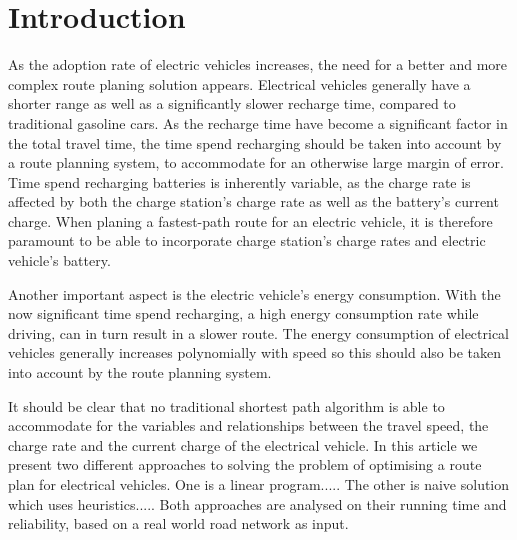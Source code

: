 \section{Introduction}
As the adoption rate of electric vehicles increases, the need for a better and more complex route planing solution appears. Electrical vehicles generally have a shorter range as well as a significantly slower recharge time, compared to traditional gasoline cars. As the recharge time have become a significant factor in the total travel time, the time spend recharging should be taken into account by a route planning system, to accommodate for an otherwise large margin of error. Time spend recharging batteries is inherently variable, as the charge rate is affected by both the charge station's charge rate as well as the battery's current charge. When planing a fastest-path route for an electric vehicle, it is therefore paramount to be able to incorporate charge station's charge rates and electric vehicle's battery.

Another important aspect is the electric vehicle's energy consumption. With the now significant time spend recharging, a high energy consumption rate while driving, can in turn result in a slower route. The energy consumption of electrical vehicles generally increases polynomially with speed so this should also be taken into account by the route planning system.

It should be clear that no traditional shortest path algorithm is able to accommodate for the variables and relationships between the travel speed, the charge rate and the current charge of the electrical vehicle. In this article we present two different approaches to solving the problem of optimising a route plan for electrical vehicles. One is a linear program..... The other is naive solution which uses heuristics..... Both approaches are analysed on their running time and reliability, based on a real world road network as input.



